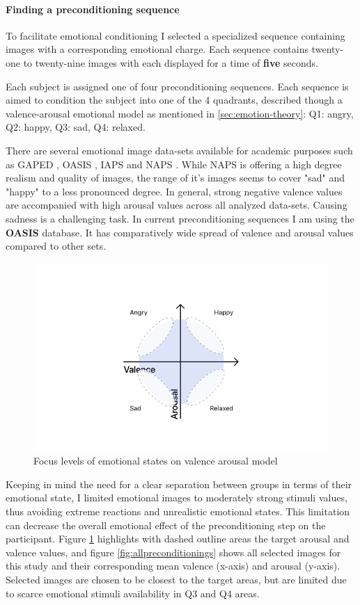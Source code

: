 \paragraph{Finding a preconditioning sequence}
To facilitate emotional conditioning I selected a specialized sequence containing images with a corresponding emotional charge.
Each sequence contains twenty-one to twenty-nine images with each displayed for a time of \textbf{five} seconds.

Each subject is assigned one of four preconditioning sequences. Each sequence is aimed to condition the subject into one of the 4 quadrants, described though a valence-arousal emotional model as mentioned in \ref{sec:emotion-theory}: Q1: angry, Q2: happy, Q3: sad, Q4: relaxed.

There are several emotional image data-sets available for academic purposes such as GAPED \cite{Dan-Glauser2011}, OASIS \cite{Kurdi2017}, IAPS \cite{Lang1997} and NAPS \cite{Marchewka2014}. While NAPS is offering a high degree realism and quality of images, the range of it's images seems to cover "sad" and "happy" to a less pronounced degree. In general, strong negative valence values are accompanied with high arousal values across all analyzed data-sets. Causing sadness is a challenging task. In current preconditioning sequences I am using the \textbf{OASIS} database. It has comparatively wide spread of valence and arousal values compared to other sets.

\begin{figure}
	\centering
	\includegraphics[width=0.7\linewidth]{graphics/Valence-Arousal-Model-1.png}
	\caption{Focus levels of emotional states on valence arousal model}
	\label{fig:valence-arousal-model-2}
\end{figure}

Keeping in mind the need for a clear separation between groups in terms of their emotional state, I limited emotional images to moderately strong stimuli values, thus avoiding extreme reactions and unrealistic emotional states. This limitation can decrease the overall emotional effect of the preconditioning step on the participant. Figure \ref{fig:valence-arousal-model-2} highlights with dashed outline areas the target arousal and valence values, and figure \ref{fig:allpreconditionings} shows all selected images for this study and their corresponding mean valence (x-axis) and arousal (y-axis). Selected images are chosen to be closest to the target areas, but are limited due to scarce emotional stimuli availability in Q3 and Q4 areas.

